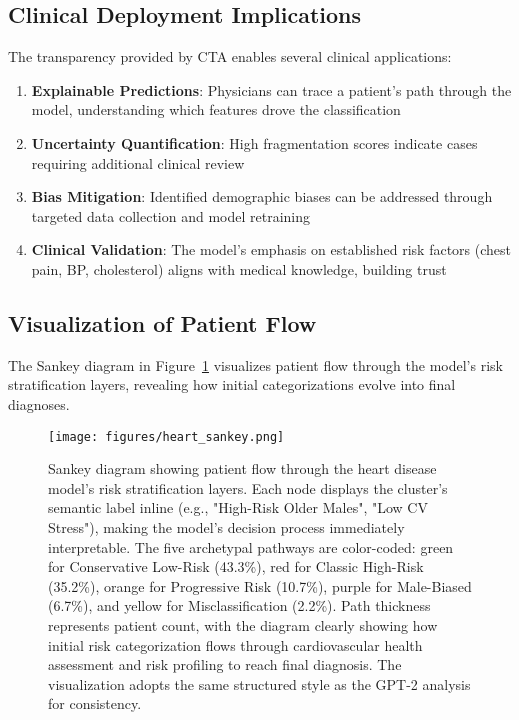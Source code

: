 \subsection{Clinical Deployment Implications}

The transparency provided by CTA enables several clinical applications:

\begin{enumerate}
    \item \textbf{Explainable Predictions}: Physicians can trace a patient's path through the model, understanding which features drove the classification
    \item \textbf{Uncertainty Quantification}: High fragmentation scores indicate cases requiring additional clinical review
    \item \textbf{Bias Mitigation}: Identified demographic biases can be addressed through targeted data collection and model retraining
    \item \textbf{Clinical Validation}: The model's emphasis on established risk factors (chest pain, BP, cholesterol) aligns with medical knowledge, building trust
\end{enumerate}


\subsection{Visualization of Patient Flow}

The Sankey diagram in Figure~\ref{fig:heart_sankey} visualizes patient flow through the model's risk stratification layers, revealing how initial categorizations evolve into final diagnoses.

\begin{figure}[!htbp]
    \centering
    \texttt{[image: figures/heart\_sankey.png]}
    \caption{Sankey diagram showing patient flow through the heart disease model's risk stratification layers. Each node displays the cluster's semantic label inline (e.g., "High-Risk Older Males", "Low CV Stress"), making the model's decision process immediately interpretable. The five archetypal pathways are color-coded: green for Conservative Low-Risk (43.3\%), red for Classic High-Risk (35.2\%), orange for Progressive Risk (10.7\%), purple for Male-Biased (6.7\%), and yellow for Misclassification (2.2\%). Path thickness represents patient count, with the diagram clearly showing how initial risk categorization flows through cardiovascular health assessment and risk profiling to reach final diagnosis. The visualization adopts the same structured style as the GPT-2 analysis for consistency.}
    \label{fig:heart_sankey}
\end{figure}

